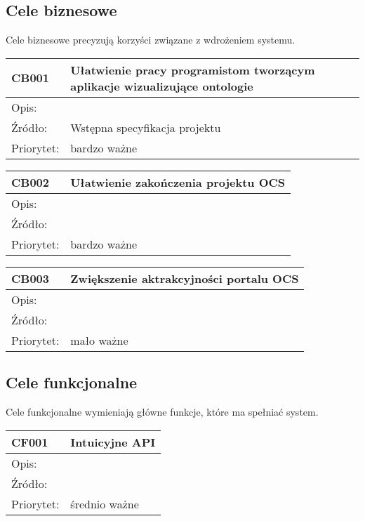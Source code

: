 \documentclass[a4paper,10pt]{article}
\begin{document}
\subsection{Cele biznesowe}

Cele biznesowe precyzują korzyści związane z wdrożeniem systemu.

\begin{center}
\begin{tabular}{|l|l|} \hline

CB001 & Ułatwienie pracy programistom tworzącym aplikacje wizualizujące ontologie  \\ \hline
Opis: &  \\ \hline
Źródło: & Wstępna specyfikacja projektu \\ \hline
Priorytet: & bardzo ważne \\ \hline
\end{tabular}
\end{center}
\begin{center}
\begin{tabular}{|l|l|} \hline
CB002 & Ułatwienie zakończenia projektu OCS   \\ \hline
Opis: &  \\ \hline
Źródło: &  \\ \hline
Priorytet: & bardzo ważne \\ \hline
\end{tabular}
\end{center}

\begin{center}
\begin{tabular}{|l|l|} \hline
CB003 & Zwiększenie aktrakcyjności portalu OCS   \\ \hline
Opis: &  \\ \hline
Źródło: &  \\ \hline
Priorytet: & mało ważne \\ \hline
\end{tabular}
\end{center}


\subsection{Cele funkcjonalne}

Cele funkcjonalne wymieniają główne funkcje, które ma spełniać system.

\begin{center}
\begin{tabular}{|l|l|} \hline

CF001 & Intuicyjne API \\ \hline
Opis: &  \\ \hline
Źródło: &  \\ \hline
Priorytet: & średnio ważne  \\ \hline

\end{tabular}
\end{center}
\end{document}
